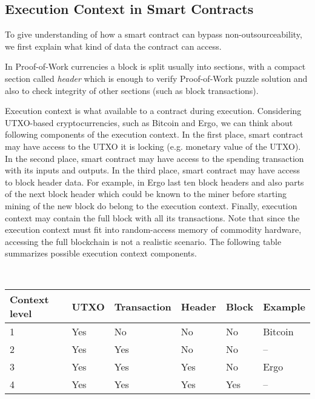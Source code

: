 \documentclass[runningheads]{llncs}
\begin{document}

\subsection{Execution Context in Smart Contracts}
\label{context}

To give understanding of how a smart contract can bypass non-outsourceability, we first explain what kind of data the contract
can access.

In Proof-of-Work currencies a block is split usually into sections, with a compact section called {\em header} which is
enough to verify Proof-of-Work puzzle solution and also to check integrity of other sections (such as block transactions).

Execution context is what available to a contract during execution. Considering UTXO-based cryptocurrencies, such as
Bitcoin and Ergo, we can think about following components of the execution context. In the first place, smart contract
 may have access to the UTXO it is locking (e.g. monetary value of the UTXO). In the second place, smart contract may
 have access to the spending transaction with its inputs and outputs. In the third place, smart contract may have access
 to block header data. For example, in Ergo last ten block headers and also parts of the next block header which could
 be known to the miner before starting mining of the new block do belong to the execution context. Finally, execution
 context may contain the full block with all its transactions. Note that since the execution context must fit into
 random-access memory of commodity hardware, accessing the full blockchain is not a realistic scenario. The following
 table summarizes possible execution context components.

~\\
\begin{tabular}{|l|l|l|l|l|l|}\hline
	Context level & UTXO & Transaction & Header      & Block & Example \\ \hline
	 1     & Yes  & No          & No  		   & No    & Bitcoin~\cite{Nak08} \\
	 2     & Yes & Yes         & No 		   & No    & -- \\
	 3     & Yes & Yes         & Yes 		   & No    & Ergo ~\cite{ergo}   \\
	 4     & Yes & Yes         & Yes 		   & Yes   & --    \\\hline
\end{tabular}
	
\end{document}
